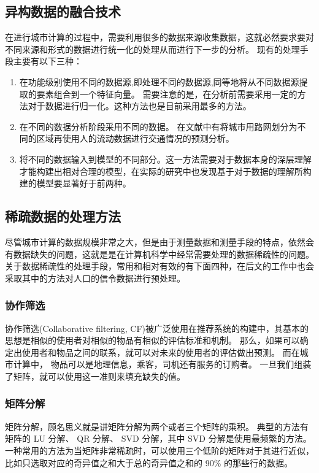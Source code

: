 \subsection{异构数据的融合技术}
在进行城市计算的过程中，需要利用很多的数据来源收集数据，这就必然要求要对不同来源和形式的数据进行统一化的处理从而进行下一步的分析。
现有的处理手段主要有以下三种：
\begin{enumerate}
	\item 在功能级别使用不同的数据源,即处理不同的数据源,同等地将从不同数据源提取的要素组合到一个特征向量。 需要注意的是，在分析前需要采用一定的方法对于数据进行归一化。这种方法也是目前采用最多的方法。
	\item 在不同的数据分析阶段采用不同的数据。 在文献中\cite{zheng2011urban}有将城市用路网划分为不同的区域再使用人的流动数据进行交通情况的预测分析。
	\item 将不同的数据输入到模型的不同部分。这一方法需要对于数据本身的深层理解才能构建出相对合理的模型，在实际的研究\cite{Zheng2013U,yuan2012discovering}中也发现基于对于数据的理解所构建的模型要显著好于前两种。
\end{enumerate}

\subsection{稀疏数据的处理方法}
尽管城市计算的数据规模非常之大，但是由于测量数据和测量手段的特点，依然会有数据缺失的问题，这就是是在计算机科学中经常需要处理的数据稀疏性的问题。 关于数据稀疏性的处理手段，常用和相对有效的有下面四种，在后文的工作中也会采取其中的方法对人口的信令数据进行预处理。
\subsubsection*{协作筛选}
协作筛选(Collaborative filtering, CF)被广泛使用在推荐系统的构建中，其基本的思想是相似的使用者对相似的物品有相似的评估标准和机制\cite{goldberg1992using}。 那么，如果可以确定出使用者和物品之间的联系，就可以对未来的使用者的评估做出预测\cite{nakamura1998collaborative}。 而在城市计算中， 物品可以是地理信息，乘客，司机还有服务的订购者。 一旦我们组装了矩阵，就可以使用这一准则来填充缺失的值。
\subsubsection*{矩阵分解}
矩阵分解，顾名思义就是讲矩阵分解为两个或者三个矩阵的乘积。 典型的方法有矩阵的 LU 分解、 QR 分解、 SVD 分解，其中 SVD 分解是使用最频繁的方法。 一种常用的方法为当矩阵非常稀疏时，可以使用三个低阶的矩阵对于其进行近似，比如只选取对应的奇异值之和大于总的奇异值之和的 90\% 的那些行的数据。
